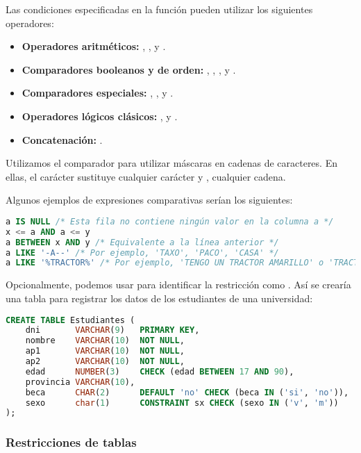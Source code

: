 Las condiciones especificadas en la función  pueden utilizar los siguientes operadores:

\begin{itemize}
	\item\textbf{Operadores aritméticos:} \code{+}, \code{-}, \code{*} y \code{/}.
	\item\textbf{Comparadores booleanos y de orden:} \code{=}, \code{!=}, \code{<} \code{>}, \code{<=} y \code{>=}.
	\item\textbf{Comparadores especiales:} , ,  y .
	\item\textbf{Operadores lógicos clásicos:} ,  y .
	\item\textbf{Concatenación:} \code{||}.
\end{itemize}

Utilizamos el comparador  para utilizar máscaras en cadenas de caracteres.
En ellas, el carácter \code{-} sustituye cualquier carácter y \code{\%}, cualquier cadena.

Algunos ejemplos de expresiones comparativas serían los siguientes:

\begin{lstlisting}[language=SQL]
a IS NULL /* Esta fila no contiene ningún valor en la columna a */
x <= a AND a <= y
a BETWEEN x AND y /* Equivalente a la línea anterior */
a LIKE '-A--' /* Por ejemplo, 'TAXO', 'PACO', 'CASA' */
a LIKE '%TRACTOR%' /* Por ejemplo, 'TENGO UN TRACTOR AMARILLO' o 'TRACTOR BONICO' */
\end{lstlisting}

Opcionalmente, podemos usar  para identificar la restricción como .
Así se crearía una tabla para registrar los datos de los estudiantes de una universidad:

\begin{lstlisting}[language=SQL]
CREATE TABLE Estudiantes (
	dni       VARCHAR(9)   PRIMARY KEY,
	nombre    VARCHAR(10)  NOT NULL,
	ap1       VARCHAR(10)  NOT NULL,
	ap2       VARCHAR(10)  NOT NULL,
	edad      NUMBER(3)    CHECK (edad BETWEEN 17 AND 90),
	provincia VARCHAR(10),
	beca      CHAR(2)      DEFAULT 'no' CHECK (beca IN ('si', 'no')),
	sexo      char(1)      CONSTRAINT sx CHECK (sexo IN ('v', 'm'))
);
\end{lstlisting}

\subsubsection{Restricciones de tablas}

